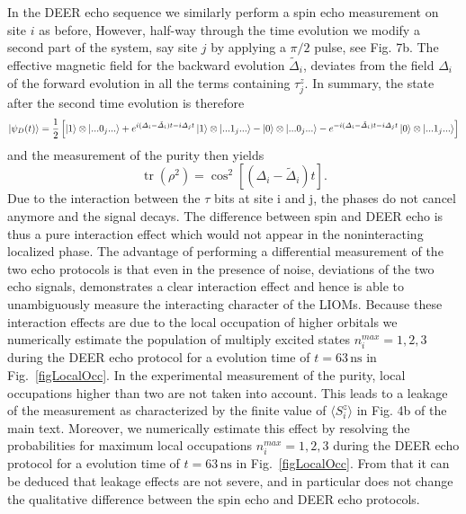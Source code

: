 \documentclass[8pt]{article}
\DeclareMathOperator{\tr}{\mbox{tr}}
\def\ket#1{\mathinner{|{#1}\rangle}}
\begin{document}
In the DEER echo sequence we similarly perform a spin echo measurement on site $i$ as before, However, half-way through the time evolution we modify a second part of the system, say site $j$ by applying a $\pi/2$ pulse, see
Fig. 7b. The effective magnetic field for the backward evolution $\tilde \Delta_i$, deviates from the field $\Delta_i$ of the forward evolution in all the terms containing $\tau_j^z$.
In summary, the state after the second time evolution is therefore
\begin{equation}
\ket{\psi_{D}(t)} = \frac{1}{2} \left[\ket{1}\otimes\ket{...0_j...} + e^{i (\Delta_i-\tilde{\Delta}_i) t - i\Delta_j t} \ket{1}\otimes \ket{...1_j...} - \ket{0}\otimes\ket{...0_j...}- e^{-i (\Delta_i-\tilde{\Delta}_i) t - i \Delta_j t} \ket{0}\otimes \ket{...1_j...}
\right]
\label{eq:deer_finaltime}
\end{equation}
and the measurement of the purity then yields
\begin{equation}
\tr \left(\rho^2\right) = \cos^2\left[\left(\Delta_i-\tilde{\Delta}_i\right) t\right].
\end{equation}
Due to the interaction between the $\tau$ bits at site i and j, the phases do not cancel anymore and the signal decays. The difference between spin and DEER echo is thus a pure interaction effect which would not appear in the noninteracting localized phase. The advantage of performing a differential measurement of the two echo protocols is that even in the presence of noise, deviations of the two echo signals, demonstrates a clear interaction effect and hence is able to unambiguously measure the interacting character of the LIOMs.
Because these interaction effects are due to the local occupation of higher orbitals we numerically estimate the population of multiply excited states $n_i^{max} = 1,2,3$ during the DEER echo protocol for a evolution time of $t = 63 \, \text{ns}$ in Fig.~\ref{figLocalOcc}.
In the experimental measurement of the purity, local occupations higher than two are not taken into account. This leads to a leakage of the measurement as characterized by the finite value of $\langle S^z_i\rangle$ in Fig. 4b of the main text. Moreover, we numerically estimate this effect by resolving the probabilities for maximum local occupations $n_i^{max} = 1,2,3$ during the DEER echo protocol for a evolution time of $t = 63 \, \text{ns}$ in Fig.~\ref{figLocalOcc}.
 From that it can be deduced that leakage effects are not severe, and in particular does not change the qualitative difference between the spin echo and DEER echo protocols.
\end{document}
